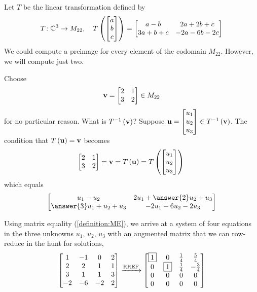 \documentclass{ximera}
\begin{document}
\begin{example}
Let $T$ be the linear transformation defined by
\[T\colon \mathbb{C}^{3}\rightarrow M_{22},\quad
T\left(\begin{bmatrix}a\\b\\c\end{bmatrix}\right)=
\begin{bmatrix}
a-b&2a+2b+c\\
3a+b+c&-2a-6b-2c
\end{bmatrix}
\]
We could compute a preimage for every element of the codomain
$M_{22}$.  However, we will compute just two.

Choose
\[
\mathbf{v}=
\begin{bmatrix}
2&1\\3&2
\end{bmatrix}
\in M_{22}
\]
for no particular reason.  What is $T^{-1}\left(\mathbf{v}\right)$?  Suppose $\mathbf{u}=\begin{bmatrix}u_1\\u_2\\u_3\end{bmatrix}\in T^{-1}\left(\mathbf{v}\right)$.  The condition that $T\left(\mathbf{u}\right)=\mathbf{v}$ becomes
\[
\begin{bmatrix}
2&1\\3&2
\end{bmatrix}
=\mathbf{v}
=T\left(\mathbf{u}\right)
=T\left(\begin{bmatrix}u_1\\u_2\\u_3\end{bmatrix}\right)\\
\]
which equals 
\[
\begin{bmatrix}
u_1-u_2&2u_1+\answer{2}u_2+u_3\\
\answer{3}u_1+u_2+u_3&-2u_1-6u_2-2u_3
\end{bmatrix}
\]

Using matrix equality (\ref{definition:ME}), we arrive at a system of four equations in the three unknowns $u_1,\,u_2,\,u_3$ with an augmented matrix that we can row-reduce in the hunt for solutions,
\[
\begin{bmatrix}
1 & -1 & 0 & 2\\
2 & 2 & 1 & 1\\
3 & 1 & 1 & 3\\
-2 & -6 & -2 & 2
\end{bmatrix}
\xrightarrow{\text{RREF}}
\begin{bmatrix}
\fbox{1} & 0 & \frac{1}{4} &  \frac{5}{4}\\
0 & \fbox{1} & \frac{1}{4} &  -\frac{3}{4}\\
0 & 0 & 0 &  0\\
0 & 0 & 0 &  0
\end{bmatrix}
\]


\end{example}
\end{document}
